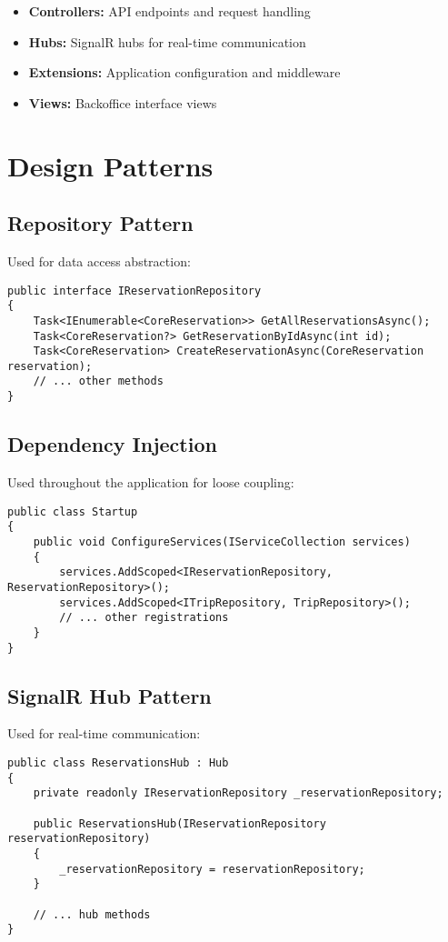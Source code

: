 \begin{itemize}
    \item \textbf{Controllers:} API endpoints and request handling
    \item \textbf{Hubs:} SignalR hubs for real-time communication
    \item \textbf{Extensions:} Application configuration and middleware
    \item \textbf{Views:} Backoffice interface views
\end{itemize}

\section{Design Patterns}

\subsection{Repository Pattern}
Used for data access abstraction:

\begin{lstlisting}[language=CSharp]
public interface IReservationRepository
{
    Task<IEnumerable<CoreReservation>> GetAllReservationsAsync();
    Task<CoreReservation?> GetReservationByIdAsync(int id);
    Task<CoreReservation> CreateReservationAsync(CoreReservation reservation);
    // ... other methods
}
\end{lstlisting}

\subsection{Dependency Injection}
Used throughout the application for loose coupling:

\begin{lstlisting}[language=CSharp]
public class Startup
{
    public void ConfigureServices(IServiceCollection services)
    {
        services.AddScoped<IReservationRepository, ReservationRepository>();
        services.AddScoped<ITripRepository, TripRepository>();
        // ... other registrations
    }
}
\end{lstlisting}

\subsection{SignalR Hub Pattern}
Used for real-time communication:

\begin{lstlisting}[language=CSharp]
public class ReservationsHub : Hub
{
    private readonly IReservationRepository _reservationRepository;
    
    public ReservationsHub(IReservationRepository reservationRepository)
    {
        _reservationRepository = reservationRepository;
    }
    
    // ... hub methods
}
\end{lstlisting}

